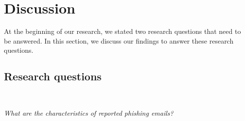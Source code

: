 %

\chapter{Discussion}

At the beginning of our research, we stated two research questions
that need to be answered. In this section, we discuss our findings
to answer these research questions.


\section{Research questions}

\ 

\textit{What are the characteristics of reported phishing emails?}

\ 

